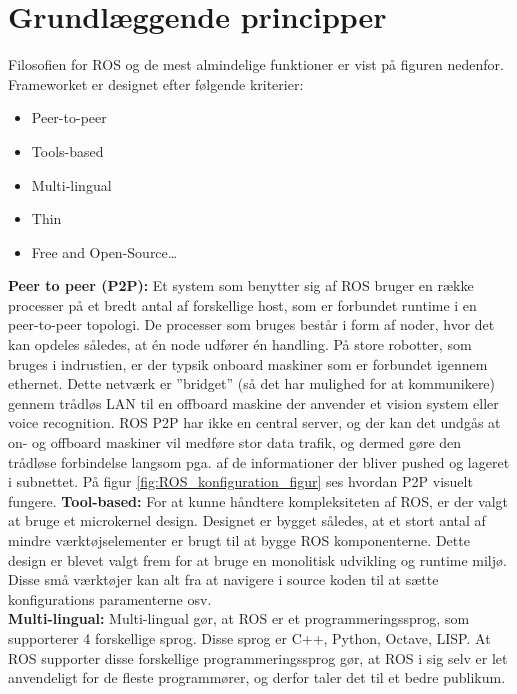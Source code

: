 \section{Grundlæggende principper}
Filosofien for ROS og de mest almindelige funktioner er vist på figuren nedenfor.
Frameworket er designet efter følgende kriterier:
\begin{itemize}  
\item Peer-to-peer
\item Tools-based 
\item Multi-lingual
\item Thin
\item Free and Open-Source\ldots 
\end{itemize}
\textbf{Peer to peer (P2P):}
Et system som benytter sig af ROS bruger en række processer på et bredt antal af forskellige host, som er forbundet runtime i en peer-to-peer topologi.
De processer som bruges består i form af noder, hvor det kan opdeles således, at én node udfører én handling. På store robotter, som bruges i indrustien, er der typsik onboard maskiner som er forbundet igennem ethernet.
Dette netværk er ''bridget'' (så det har mulighed for at kommunikere) gennem trådløs LAN til en offboard maskine der anvender et vision system eller voice recognition.
ROS P2P har ikke en central server, og der kan det undgås at on- og offboard maskiner vil medføre stor data trafik, og dermed gøre den trådløse forbindelse langsom pga. af de informationer der bliver pushed og lageret i subnettet.
På figur \ref{fig:ROS_konfiguration_figur} ses hvordan P2P visuelt fungere. 
\textbf{Tool-based:} For at kunne håndtere kompleksiteten af ROS, er der valgt at bruge et microkernel design.
Designet er bygget således, at et stort antal af mindre værktøjselementer er brugt til at bygge ROS komponenterne.
Dette design er blevet valgt frem for at bruge en monolitisk udvikling og runtime miljø.
Disse små værktøjer kan alt fra at navigere i source koden til at sætte konfigurations paramenterne osv.\\
\newline
\textbf{Multi-lingual:} Multi-lingual gør, at ROS er et programmeringssprog, som supporterer 4 forskellige sprog.
Disse sprog er C++, Python, Octave, LISP.
At ROS supporter disse forskellige programmeringssprog gør, at ROS i sig selv er let anvendeligt for de fleste programmører, og derfor taler det til et bedre publikum.
